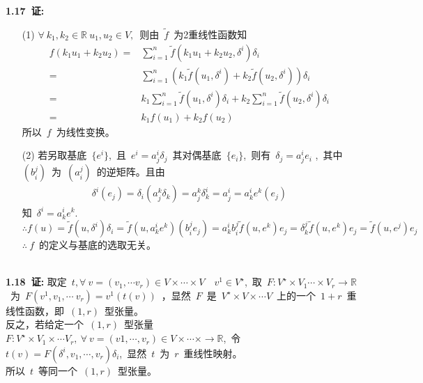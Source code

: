 \noindent
\\
\\
{\textbf{1.17\ 证:}}
\begin{itemize}
	\item [(1)]
	$\forall\ k_1,k_2\in \mathbb{R}\ u_1,u_2\in V,$\ 则由\ $\tilde{f}$\ 为2重线性函数知
	\begin{align*}
	f(k_1u_1+k_2u_2)=&\sum_{i=1}^{n}\tilde{f}(k_1u_1+k_2u_2,\delta^i)\delta_i
	                \\
	                =&\sum_{i=1}^{n}(k_1\tilde{f}(u_1,\delta^i)+k_2\tilde{f}(u_2,\delta^i))\delta_i
	                \\
	                =&k_1\sum_{i=1}^{n}\tilde{f}(u_1,\delta^i)\delta_i+k_2\sum_{i=1}^{n}\tilde{f}(u_2,\delta^i)\delta_i
	                \\
	                =&k_1f(u_1)+k_2f(u_2)
	\end{align*}
	所以\ $f$\ 为线性变换。
	\item [(2)]
	若另取基底\ $\{e^i\}$,\ 且\ $e^i=a^i_j\delta_j$\, 其对偶基底\ $\{e_i\}$,\ 则有\ $\delta_j=a^i_je_i$ ,\ 其中\ $(b^j_i)$\ 为\ $(a_i^j)$\ 的逆矩阵。且由
	\begin{align*}
	\delta^i(e_j)=\delta_i(a^k_j\delta_k)=a^k_j\delta_k^i=a^i_j=a_k^ie^k(e_j)
	\end{align*} 
	知\ $\delta^i=a^i_ke^k.$
	\\
	$\therefore f(u)=\tilde{f}(u,\delta^i)\delta_i=\tilde{f}(u,a^i_ke^k)(b^j_ie_j)=a^i_kb^j_i\tilde{f}(u,e^k)e_j=\delta_k^j\tilde{f}(u,e^k)e_j=\tilde{f}(u,e^j)e_j$
	\\
	$\therefore\ f$\ 的定义与基底的选取无关。
\end{itemize}


\noindent
\\
{\textbf{1.18\ 证:}}
取定\ $t,\forall \ v=(v_1,\cdots v_r) \in V\times \cdots \times V\quad v^1\in V^\star$,\ 取\ $F:V^\star \times V_1\cdots \times V_r \to \mathbb{R}$\ 为\ $F(v^1,v_1,\cdots\ v_r)=v^1(t(v))$\ ，显然\ $F$\ 是\ $V^\star\times V \times \cdots V$\ 上的一个\ $1+r$\ 重线性函数，即\ $(1,r)$\ 型张量。 
\\
反之，若给定一个\ $(1,r)$\ 型张量\ $F:V^\star\times V_1\times \cdots V_r,\ \forall \ v=(v1,\cdots, v_r)\in V\times \cdots \times \to \mathbb{R}  $,\ 令\ $t(v)=F(\delta^i,v_1,\cdots ,v_r)\delta_i$,\ 显然\ $t$\ 为\ $r$\ 重线性映射。
\\
所以\ $t$\ 等同一个\ $(1,r)$\ 型张量。




